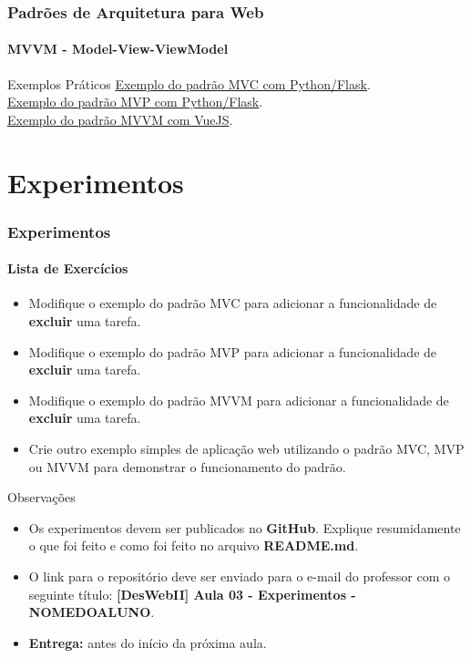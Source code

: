 \documentclass[
	9pt, %
	t, %
]{beamer}
\newcommand{\iconLink}[2]{\href{#1}{\faLink \hspace{0.2em} {#2}}}
\begin{document}
\begin{frame}
	\frametitle{Padrões de Arquitetura para Web}
	\framesubtitle{MVVM - Model-View-ViewModel}

	\begin{block}{Exemplos Práticos}
		\iconLink{https://gist.github.com/fabricioifc/d1bde9f4a13cf63b49870be4bc87a72f}{Exemplo do padrão MVC com Python/Flask}.\\
		\iconLink{https://gist.github.com/fabricioifc/663f8abcba307a013bb56d214752458b}{Exemplo do padrão MVP com Python/Flask}.\\
		\iconLink{https://codepen.io/fabriciobizotto/pen/MWxeONo}{Exemplo do padrão MVVM com VueJS}.
	\end{block}
\end{frame}


\section{Experimentos}

\begin{frame}
	\frametitle{Experimentos}
	\framesubtitle{Lista de Exercícios}
	
	\begin{itemize}
		\item Modifique o exemplo do padrão MVC para adicionar a funcionalidade de \textbf{excluir} uma tarefa.
		\item Modifique o exemplo do padrão MVP para adicionar a funcionalidade de \textbf{excluir} uma tarefa.
		\item Modifique o exemplo do padrão MVVM para adicionar a funcionalidade de \textbf{excluir} uma tarefa.
		\item Crie outro exemplo simples de aplicação web utilizando o padrão MVC, MVP ou MVVM para demonstrar o funcionamento do padrão.
	\end{itemize}

	\begin{block}{Observações}
		\begin{itemize}
			\item Os experimentos devem ser publicados no \textbf{GitHub}. Explique resumidamente o que foi feito e como foi feito no arquivo \textbf{README.md}.
			\item O link para o repositório deve ser enviado para o e-mail do professor com o seguinte título: \textbf{[DesWebII] Aula 03 - Experimentos - NOMEDOALUNO}.
			\item \textbf{Entrega:} antes do início da próxima aula.
		\end{itemize}
	\end{block}
	
\end{frame}
\end{document}
